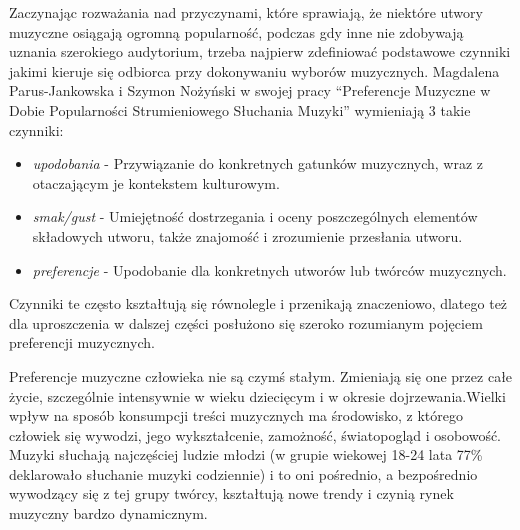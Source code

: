 \documentclass[a4paper,11pt]{article}
\begin{document}
    Zaczynając rozważania nad przyczynami, które sprawiają, że niektóre utwory muzyczne osiągają ogromną popularność, podczas gdy inne nie zdobywają uznania szerokiego audytorium, trzeba najpierw zdefiniować podstawowe czynniki jakimi kieruje się odbiorca przy dokonywaniu wyborów muzycznych. Magdalena Parus-Jankowska i Szymon Nożyński w swojej pracy ``Preferencje Muzyczne w Dobie Popularności Strumieniowego Słuchania Muzyki''\cite{PreferencjeMuzyczneWCzasachSteamingu2020} wymieniają 3 takie czynniki:
    \begin{itemize}
        \item \textit{upodobania} - Przywiązanie do konkretnych gatunków muzycznych, wraz z otaczającym je kontekstem kulturowym.
        \item \textit{smak/gust} - Umiejętność dostrzegania i oceny poszczególnych elementów składowych utworu, także znajomość i zrozumienie przesłania utworu.
        \item \textit{preferencje} - Upodobanie dla konkretnych utworów lub twórców muzycznych.
    \end{itemize}

    \smallskip

    Czynniki te często kształtują się równolegle i przenikają znaczeniowo, dlatego też dla uproszczenia w dalszej części posłużono się szeroko rozumianym pojęciem preferencji muzycznych.

    \bigskip

    Preferencje muzyczne człowieka nie są czymś stałym. Zmieniają się one przez całe życie, szczególnie intensywnie w wieku dziecięcym i w okresie dojrzewania\cite{PreferencjeMuzyczneWCzasachSteamingu2020}.Wielki wpływ na sposób konsumpcji treści muzycznych ma środowisko, z którego człowiek się wywodzi, jego wykształcenie, zamożność, światopogląd i osobowość\cite{PreferencjeMuzyczneWCzasachSteamingu2020}. Muzyki słuchają najczęściej ludzie młodzi (w grupie wiekowej 18-24 lata 77\% deklarowało słuchanie muzyki codziennie\cite{cbos2018}) i to oni pośrednio, a bezpośrednio wywodzący się z tej grupy twórcy, kształtują nowe trendy i czynią rynek muzyczny bardzo dynamicznym.

    \bigskip
\end{document}
